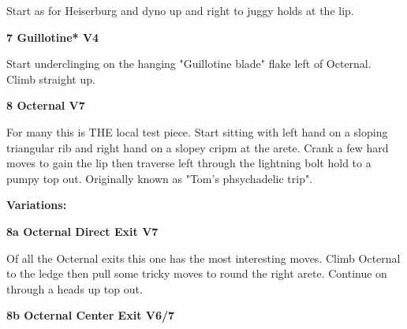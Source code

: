 \begin{multicols}{2}
\begin{adjustwidth}{0.5cm}{}
\begin{minipage}{\linewidth}
							\begin{adjustwidth}{0.5cm}{}				
							Start as for Heiserburg and dyno up and right to juggy holds at the lip.
							\end{adjustwidth}
							\end{minipage}
						\end{adjustwidth}
					\begin{minipage}{\linewidth}	
					\label{rt:Guillotine}
\colorbox{RoyalBlue!20}{
\parbox{0.95\textwidth}{
\textbf{
7 Guillotine* V4    
}
}
}

					\begin{adjustwidth}{0.5cm}{}				
					Start underclinging on the hanging "Guillotine blade" flake left of Octernal. Climb straight up.
					\end{adjustwidth}
					\end{minipage}
					\begin{minipage}{\linewidth}	
					\label{rt:Octernal}
\colorbox{Goldenrod!50}{
\parbox{0.95\textwidth}{
\textbf{
8 Octernal V7     
}
}
}

					\begin{adjustwidth}{0.5cm}{}				
					For many this is THE local test piece. Start sitting with left hand on a sloping triangular rib and right hand on a slopey cripm at the arete. Crank a few hard moves to gain the lip then traverse left through the lightning bolt hold to a pumpy top out. Originally known as "Tom's phsychadelic trip".
					\end{adjustwidth}
					\end{minipage}
						\begin{adjustwidth}{0.5cm}{}				
						\textbf{Variations:} \newline
							\begin{minipage}{\linewidth}	
							\label{vr:Octernal Direct Exit}
\colorbox{Goldenrod!50}{
\parbox{0.95\textwidth}{
\textbf{
8a Octernal Direct Exit V7     
}
}
}

							\begin{adjustwidth}{0.5cm}{}				
							Of all the Octernal exits this one has the most interesting moves. Climb Octernal to the ledge then pull some tricky moves to round the right arete. Continue on through a heads up top out.
							\end{adjustwidth}
							\end{minipage}
							\begin{minipage}{\linewidth}	
							\label{vr:Octernal Center Exit}
\colorbox{Goldenrod!50}{
\parbox{0.95\textwidth}{
\textbf{
8b Octernal Center Exit V6/7    
}
}
}


\end{minipage}
\end{adjustwidth}
\end{multicols}
